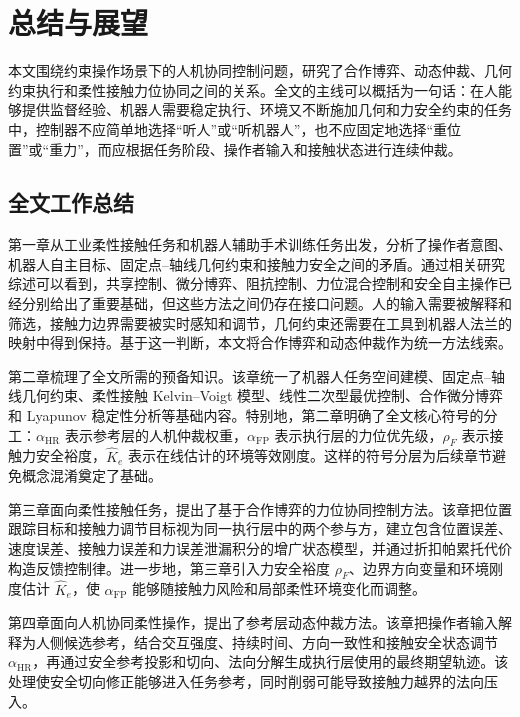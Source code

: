 \chapter{总结与展望}
\label{chap:conclusion}

本文围绕约束操作场景下的人机协同控制问题，研究了合作博弈、动态仲裁、几何约束执行和柔性接触力位协同之间的关系。全文的主线可以概括为一句话：在人能够提供监督经验、机器人需要稳定执行、环境又不断施加几何和力安全约束的任务中，控制器不应简单地选择“听人”或“听机器人”，也不应固定地选择“重位置”或“重力”，而应根据任务阶段、操作者输入和接触状态进行连续仲裁。

\section{全文工作总结}
\label{sec:ch6_summary}

第一章从工业柔性接触任务和机器人辅助手术训练任务出发，分析了操作者意图、机器人自主目标、固定点--轴线几何约束和接触力安全之间的矛盾。通过相关研究综述可以看到，共享控制、微分博弈、阻抗控制、力位混合控制和安全自主操作已经分别给出了重要基础，但这些方法之间仍存在接口问题。人的输入需要被解释和筛选，接触力边界需要被实时感知和调节，几何约束还需要在工具到机器人法兰的映射中得到保持。基于这一判断，本文将合作博弈和动态仲裁作为统一方法线索。

第二章梳理了全文所需的预备知识。该章统一了机器人任务空间建模、固定点--轴线几何约束、柔性接触 Kelvin--Voigt 模型、线性二次型最优控制、合作微分博弈和 Lyapunov 稳定性分析等基础内容。特别地，第二章明确了全文核心符号的分工：$\alpha_{\mathrm{HR}}$ 表示参考层的人机仲裁权重，$\alpha_{\mathrm{FP}}$ 表示执行层的力位优先级，$\rho_F$ 表示接触力安全裕度，$\hat K_e$ 表示在线估计的环境等效刚度。这样的符号分层为后续章节避免概念混淆奠定了基础。

第三章面向柔性接触任务，提出了基于合作博弈的力位协同控制方法。该章把位置跟踪目标和接触力调节目标视为同一执行层中的两个参与方，建立包含位置误差、速度误差、接触力误差和力误差泄漏积分的增广状态模型，并通过折扣帕累托代价构造反馈控制律。进一步地，第三章引入力安全裕度 $\rho_F$、边界方向变量和环境刚度估计 $\hat K_e$，使 $\alpha_{\mathrm{FP}}$ 能够随接触力风险和局部柔性环境变化而调整。

第四章面向人机协同柔性操作，提出了参考层动态仲裁方法。该章把操作者输入解释为人侧候选参考，结合交互强度、持续时间、方向一致性和接触安全状态调节 $\alpha_{\mathrm{HR}}$，再通过安全参考投影和切向、法向分解生成执行层使用的最终期望轨迹。该处理使安全切向修正能够进入任务参考，同时削弱可能导致接触力越界的法向压入。

